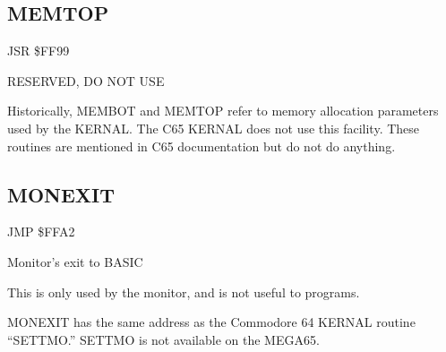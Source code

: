 
\newpage
\subsection{MEMTOP}
\label{KERNAL Jump Table!MEMTOP}
\begin{description}[leftmargin=2cm,style=nextline]
    \item [Address:] JSR \$FF99
    \item [Description:] RESERVED, DO NOT USE
    \item [Remarks:]
        Historically, MEMBOT and MEMTOP refer to memory allocation parameters used by the KERNAL. The C65 KERNAL does not use this facility. These routines are mentioned in C65 documentation but do not do anything.
\end{description}



\newpage
\subsection{MONEXIT}
\label{KERNAL Jump Table!MONEXIT}
\begin{description}[leftmargin=2cm,style=nextline]
    \item [Address:] JMP \$FFA2
    \item [Description:] Monitor's exit to BASIC
    \item [Remarks:]
        This is only used by the monitor, and is not useful to programs.

        MONEXIT has the same address as the Commodore 64 KERNAL routine ``SETTMO.'' SETTMO is not available on the MEGA65.
    \item [Example:]

\end{description}



\newpage
